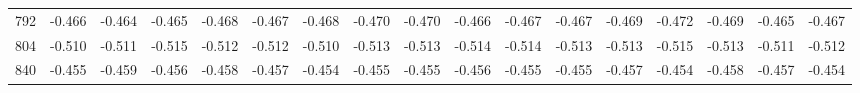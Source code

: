 \documentclass{amsart}
\begin{document}
\begin{landscape}
\begin{longtable}{rrrrrrrrrrrrrrrrr}
  792 & -0.466 & -0.464 & -0.465 & -0.468 & -0.467 & -0.468 & -0.470 & -0.470 & -0.466 & -0.467 & -0.467 & -0.469 & -0.472 & -0.469 & -0.465 & -0.467 \\ 
  804 & -0.510 & -0.511 & -0.515 & -0.512 & -0.512 & -0.510 & -0.513 & -0.513 & -0.514 & -0.514 & -0.513 & -0.513 & -0.515 & -0.513 & -0.511 & -0.512 \\ 
  840 & -0.455 & -0.459 & -0.456 & -0.458 & -0.457 & -0.454 & -0.455 & -0.455 & -0.456 & -0.455 & -0.455 & -0.457 & -0.454 & -0.458 & -0.457 & -0.454 \\ 
   \hline
\hline
\end{longtable}
\end{landscape}
\end{document}
